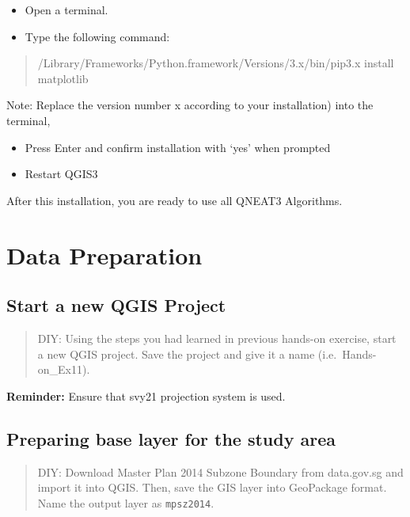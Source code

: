 \documentclass[
  letterpaper,
  DIV=11,
  numbers=noendperiod]{scrreprt}
\begin{document}
\begin{itemize}
\item
  Open a terminal.
\item
  Type the following command:
\end{itemize}

\begin{quote}
/Library/Frameworks/Python.framework/Versions/3.x/bin/pip3.x install
matplotlib
\end{quote}

Note: Replace the version number x according to your installation) into
the terminal,

\begin{itemize}
\item
  Press Enter and confirm installation with `yes' when prompted
\item
  Restart QGIS3
\end{itemize}

After this installation, you are ready to use all QNEAT3 Algorithms.

\hypertarget{data-preparation-7}{%
\section{Data Preparation}\label{data-preparation-7}}

\hypertarget{start-a-new-qgis-project-3}{%
\subsection{Start a new QGIS Project}\label{start-a-new-qgis-project-3}}

\begin{quote}
DIY: Using the steps you had learned in previous hands-on exercise,
start a new QGIS project. Save the project and give it a name
(i.e.~Hands-on\_Ex11).
\end{quote}

\textbf{Reminder:} Ensure that svy21 projection system is used.

\hypertarget{preparing-base-layer-for-the-study-area-2}{%
\subsection{Preparing base layer for the study
area}\label{preparing-base-layer-for-the-study-area-2}}

\begin{quote}
DIY: Download Master Plan 2014 Subzone Boundary from data.gov.sg and
import it into QGIS. Then, save the GIS layer into GeoPackage format.
Name the output layer as \texttt{mpsz2014}.
\end{quote}
\end{document}

